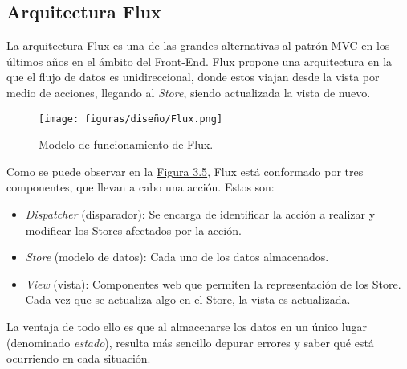 \subsection{Arquitectura Flux}

La arquitectura Flux \cite{flux} es una de las grandes alternativas al patrón MVC \cite{mvc} en los últimos años en el ámbito del Front-End. Flux propone una arquitectura en la que el flujo de datos es unidireccional, donde estos viajan desde la vista por medio de acciones, llegando al {\it Store}, siendo actualizada la vista de nuevo.

\begin{figure}[H]
\centerline{\texttt{[image: figuras/diseño/Flux.png]}}
\caption{Modelo de funcionamiento de Flux.}
\label{enlaceImagenFlux}
\end{figure}

Como se puede observar en la \hyperref[enlaceImagenFlux]{Figura 3.5}, Flux está conformado por tres componentes, que llevan a cabo una acción. Estos son:
\begin{itemize}
    \item {\it Dispatcher} (disparador): Se encarga de identificar la acción a realizar y modificar los Stores afectados por la acción.
    \item {\it Store} (modelo de datos): Cada uno de los datos almacenados.
    \item {\it View} (vista): Componentes web que permiten la representación de los Store. Cada vez que se actualiza algo en el Store, la vista es actualizada.
\end{itemize}

La ventaja de todo ello es que al almacenarse los datos en un único lugar (denominado {\it estado}), resulta más sencillo depurar errores y saber qué está ocurriendo en cada situación.